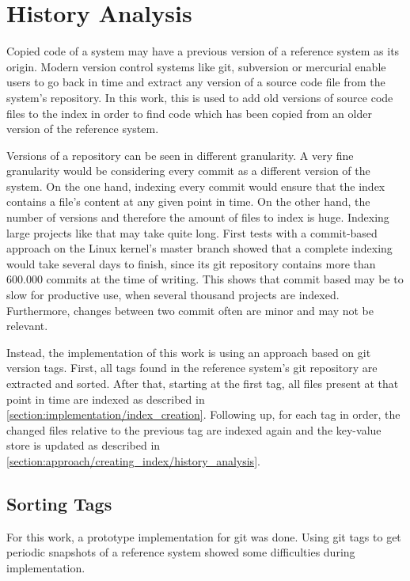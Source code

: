 \section{History Analysis}\label{section:implementation/history_analysis}
Copied code of a system may have a previous version of a reference system as its origin.
Modern version control systems like git, subversion or mercurial enable users to go back in time and extract any version of a source code file from the system's repository.
In this work, this is used to add old versions of source code files to the index in order to find code which has been copied from an older version of the reference system.

Versions of a repository can be seen in different granularity.
A very fine granularity would be considering every commit as a different version of the system.
On the one hand, indexing every commit would ensure that the index contains a file's content at any given point in time.
On the other hand, the number of versions and therefore the amount of files to index is huge.
Indexing large projects like that may take quite long.
First tests with a commit-based approach on the Linux kernel's master branch showed that a complete indexing would take several days to finish, since its git repository contains more than 600.000 commits at the time of writing.
This shows that commit based may be to slow for productive use, when several thousand projects are indexed.
Furthermore, changes between two commit often are minor and may not be relevant.

Instead, the implementation of this work is using an approach based on git version tags.
First, all tags found in the reference system's git repository are extracted and sorted.
After that, starting at the first tag, all files present at that point in time are indexed as described in \autoref{section:implementation/index_creation}.
Following up, for each tag in order, the changed files relative to the previous tag are indexed again and the key-value store is updated as described in \autoref{section:approach/creating_index/history_analysis}.

\subsection{Sorting Tags}\label{section:implementation/history_analysis/sorting_tags}
For this work, a prototype implementation for git was done.
Using git tags to get periodic snapshots of a reference system showed some difficulties during implementation.

